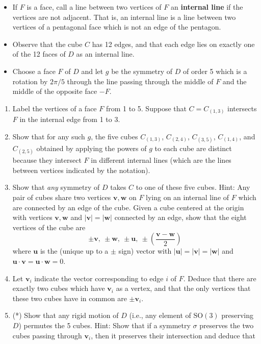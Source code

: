 \documentclass[../psets.tex]{subfiles}
\begin{document}
\begin{enumerate}
    \begin{itemize}
        \item If $F$ is a face, call a line between two vertices of $F$ an \textbf{internal line} if the vertices are not adjacent. That is, an internal line is a line between two vertices of a pentagonal face which is not an edge of the pentagon.
        \item Observe that the cube $C$ has 12 edges, and that each edge lies on exactly one of the 12 faces of $D$ as an internal line.
        \item Choose a face $F$ of $D$ and let $g$ be the symmetry of $D$ of order 5 which is a rotation by $2\pi/5$ through the line passing through the middle of $F$ and the middle of the opposite face $-F$.
    \end{itemize}
    \begin{enumerate}
        \item Label the vertices of a face $F$ from 1 to 5. Suppose that $C=C_{(1,3)}$ intersects $F$ in the internal edge from 1 to 3.
        \item Show that for any such $g$, the five cubes $C_{(1,3)}$, $C_{(2,4)}$, $C_{(3,5)}$, $C_{(1,4)}$, and $C_{(2,5)}$ obtained by applying the powers of $g$ to each cube are distinct because they intersect $F$ in different internal lines (which are the lines between vertices indicated by the notation).
        \item Show that \emph{any} symmetry of $D$ takes $C$ to one of these five cubes. Hint: Any pair of cubes share two vertices $\mathbf{v},\mathbf{w}$ on $F$ lying on an internal line of $F$ which are connected by an edge of the cube. Given a cube centered at the origin with vertices $\mathbf{v},\mathbf{w}$ and $|\mathbf{v}|=|\mathbf{w}|$ connected by an edge, show that the eight vertices of the cube are
        \begin{equation*}
            \pm\mathbf{v},\ \pm\mathbf{w},\ \pm\mathbf{u},\ \pm\left( \frac{\mathbf{v}-\mathbf{w}}{2} \right)
        \end{equation*}
        where $\mathbf{u}$ is the (unique up to a $\pm$ sign) vector with $|\mathbf{u}|=|\mathbf{v}|=|\mathbf{w}|$ and $\mathbf{u}\cdot\mathbf{v}=\mathbf{u}\cdot\mathbf{w}=0$.
        \item Let $\mathbf{v}_i$ indicate the vector corresponding to edge $i$ of $F$. Deduce that there are exactly two cubes which have $\mathbf{v}_i$ as a vertex, and that the only vertices that these two cubes have in common are $\pm\mathbf{v}_i$.
        \item (*) Show that any rigid motion of $D$ (i.e., any element of $\text{SO}(3)$ preserving $D$) permutes the 5 cubes. Hint: Show that if a symmetry $\sigma$ preserves the two cubes passing through $\mathbf{v}_i$, then it preserves their intersection and deduce that

\end{enumerate}
\end{enumerate}
\end{document}
